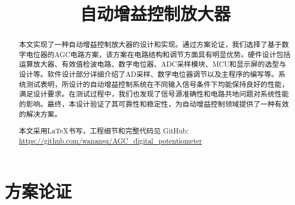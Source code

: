 \documentclass[lang=cn,11pt,a4paper]{elegantpaper}
\title{自动增益控制放大器}
\date{\zhtoday}
\begin{document}
\maketitle

\begin{abstract}
  本文实现了一种自动增益控制放大器的设计和实现。通过方案论证，我们选择了基于数字电位器的AGC电路方案，该方案在电路结构和调节方面具有明显优势。硬件设计包括运算放大器、有效值检波电路、数字电位器、ADC采样模块、MCU和显示屏的选型与设计等。软件设计部分详细介绍了AD采样、数字电位器调节以及主程序的编写等。系统测试表明，所设计的自动增益控制系统在不同输入信号条件下均能保持良好的性能，满足设计要求。在测试过程中，我们也发现了信号源准确性和电路共地问题对系统性能的影响。最终，本设计验证了其可靠性和稳定性，为自动增益控制领域提供了一种有效的解决方案。

  本文采用\LaTeX{}书写，工程细节和完整代码见 GitHub: \url{https://github.com/wanansu/AGC_digital_potentiometer}
\end{abstract}

\newpage

\begin{center}\tableofcontents\end{center}

\newpage
\section{方案论证}
\setcounter{page}{1} %
\end{document}
